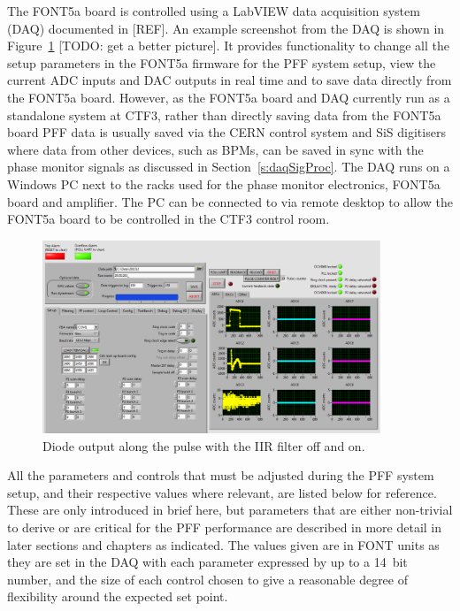 The FONT5a board is controlled using a LabVIEW data acquisition system (DAQ) documented in [REF]. An example screenshot from the DAQ is shown in Figure~\ref{f:DAQScreenshot} [TODO: get a better picture]. It provides functionality to change all the setup parameters in the FONT5a firmware for the PFF system setup, view the current ADC inputs and DAC outputs in real time and to save data directly from the FONT5a board. However, as the FONT5a board and DAQ currently run as a standalone system at CTF3, rather than directly saving data from the FONT5a board PFF data is usually saved via the CERN control system and SiS digitisers where data from other devices, such as BPMs, can be saved in sync with the phase monitor signals as discussed in Section~\ref{s:daqSigProc}. The DAQ runs on a Windows PC next to the racks used for the phase monitor electronics, FONT5a board and amplifier. The PC can be connected to via remote desktop to allow the FONT5a board to be controlled in the CTF3 control room.

\begin{figure}
  \centering
  \includegraphics[width=0.9\textwidth]{Figures/commissioning/DAQScreenshot}
  \caption{Diode output along the pulse with the IIR filter off and on.}
  \label{f:DAQScreenshot}
\end{figure}

All the parameters and controls that must be adjusted during the PFF system setup, and their respective values where relevant, are listed below for reference. These are only introduced in brief here, but parameters that are either non-trivial to derive or are critical for the PFF performance are described in more detail in later sections and chapters as indicated. The values given are in FONT units as they are set in the DAQ with each parameter expressed by up to a 14~bit number, and the size of each control chosen to give a reasonable degree of flexibility around the expected set point. 

